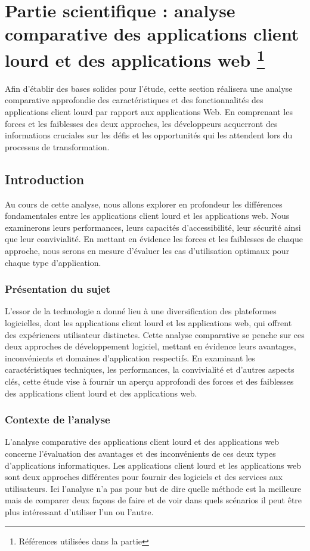 \documentclass[a4paper, 12pt, french]{article}
\begin{document}

	\newpage
	
	\section{Partie scientifique : analyse comparative des applications client lourd et des applications web \footnote{Références utilisées dans la partie }}
		Afin d'établir des bases solides pour l'étude, cette section réalisera une analyse comparative approfondie des caractéristiques et des fonctionnalités des applications client lourd par rapport aux applications Web. En comprenant les forces et les faiblesses des deux approches, les développeurs acquerront des informations cruciales sur les défis et les opportunités qui les attendent lors du processus de transformation.
		
		\subsection{Introduction}
			Au cours de cette analyse, nous allons explorer en profondeur les différences fondamentales entre les applications client lourd et les applications web. Nous examinerons leurs performances, leurs capacités d'accessibilité, leur sécurité ainsi que leur convivialité. En mettant en évidence les forces et les faiblesses de chaque approche, nous serons en mesure d'évaluer les cas d'utilisation optimaux pour chaque type d'application.
			
			\subsubsection{Présentation du sujet}
				L'essor de la technologie a donné lieu à une diversification des plateformes logicielles, dont les applications client lourd et les applications web, qui offrent des expériences utilisateur distinctes. Cette analyse comparative se penche sur ces deux approches de développement logiciel, mettant en évidence leurs avantages, inconvénients et domaines d'application respectifs. En examinant les caractéristiques techniques, les performances, la convivialité et d'autres aspects clés, cette étude vise à fournir un aperçu approfondi des forces et des faiblesses des applications client lourd et des applications web.
			
			\subsubsection{Contexte de l'analyse}
				L'analyse comparative des applications client lourd et des applications web concerne l'évaluation des avantages et des inconvénients de ces deux types d'applications informatiques. Les applications client lourd et les applications web sont deux approches différentes pour fournir des logiciels et des services aux utilisateurs. Ici l'analyse n'a pas pour but de dire quelle méthode est la meilleure mais de comparer deux façons de faire et de voir dans quels scénarios il peut être plus intéressant d'utiliser l'un ou l'autre.
			
\end{document}
